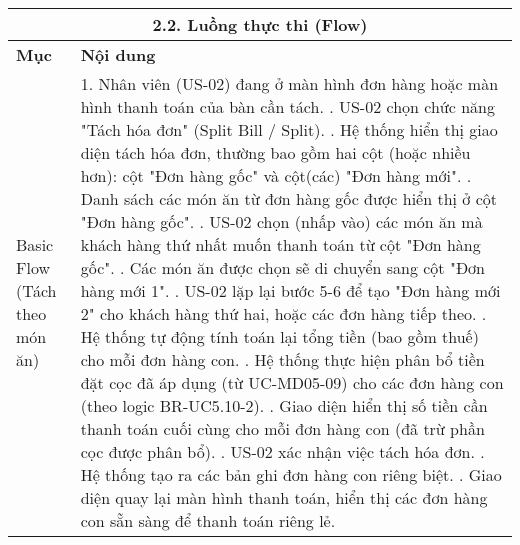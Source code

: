 \begin{longtable}{|m{4cm}|p{11cm}|}
\hline
\multicolumn{2}{|c|}{\textbf{2.2. Luồng thực thi (Flow)}} \\
\hline
\textbf{Mục} & \textbf{Nội dung} \\
\hline
Basic Flow (Tách theo món ăn) & 1. Nhân viên (US-02) đang ở màn hình đơn hàng hoặc màn hình thanh toán của bàn cần tách. \newline 2. US-02 chọn chức năng "Tách hóa đơn" (Split Bill / Split). \newline 3. Hệ thống hiển thị giao diện tách hóa đơn, thường bao gồm hai cột (hoặc nhiều hơn): cột "Đơn hàng gốc" và cột(các) "Đơn hàng mới". \newline 4. Danh sách các món ăn từ đơn hàng gốc được hiển thị ở cột "Đơn hàng gốc". \newline 5. US-02 chọn (nhấp vào) các món ăn mà khách hàng thứ nhất muốn thanh toán từ cột "Đơn hàng gốc". \newline 6. Các món ăn được chọn sẽ di chuyển sang cột "Đơn hàng mới 1". \newline 7. US-02 lặp lại bước 5-6 để tạo "Đơn hàng mới 2" cho khách hàng thứ hai, hoặc các đơn hàng tiếp theo. \newline 8. Hệ thống tự động tính toán lại tổng tiền (bao gồm thuế) cho mỗi đơn hàng con. \newline 9. Hệ thống thực hiện phân bổ tiền đặt cọc đã áp dụng (từ UC-MD05-09) cho các đơn hàng con (theo logic BR-UC5.10-2). \newline 10. Giao diện hiển thị số tiền cần thanh toán cuối cùng cho mỗi đơn hàng con (đã trừ phần cọc được phân bổ). \newline 11. US-02 xác nhận việc tách hóa đơn. \newline 12. Hệ thống tạo ra các bản ghi đơn hàng con riêng biệt. \newline 13. Giao diện quay lại màn hình thanh toán, hiển thị các đơn hàng con sẵn sàng để thanh toán riêng lẻ. \\
\hline

\end{longtable}
